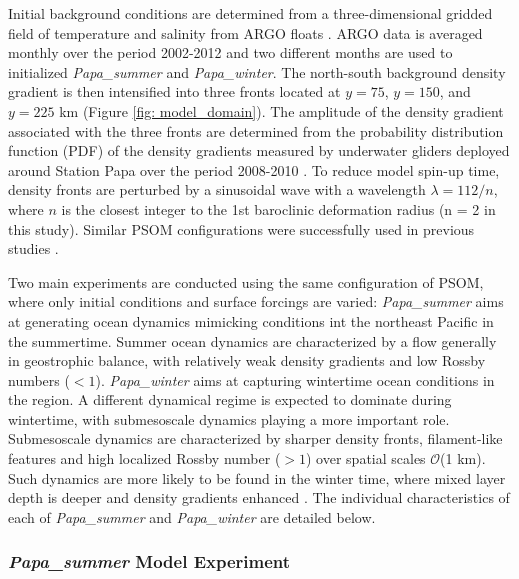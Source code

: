 \documentclass[draft,linenumbers]{agujournal2018}
\begin{document}
Initial background conditions are determined from a three-dimensional gridded field of temperature and salinity from ARGO floats \citep{Gaillard_2009,Gaillard_2016}. ARGO data is averaged monthly over the period 2002-2012 and two different months are used to initialized \textit{Papa\_summer} and \textit{Papa\_winter}. The north-south background density gradient is then intensified into three fronts located at $y = 75$, $y = 150$, and $y = 225$ km (Figure \ref{fig: model_domain}). The amplitude of the density gradient associated with the three fronts are determined from the probability distribution function (PDF) of the density gradients measured by underwater gliders deployed around Station Papa over the period 2008-2010 \citep{Pelland_2016}. To reduce model spin-up time, density fronts are perturbed by a sinusoidal wave with a wavelength $\lambda = 112/n$, where $n$ is the closest integer to the 1st baroclinic deformation radius (n = 2 in this study). Similar PSOM configurations were successfully used in previous studies \citep{Mahadevan_2012,Omand_2015}.

Two main experiments are conducted using the same configuration of PSOM, where only initial conditions and surface forcings are varied: \textit{Papa\_summer} aims at generating ocean dynamics mimicking conditions int the northeast Pacific in the summertime. Summer ocean dynamics are characterized by a flow generally in geostrophic balance, with relatively weak density gradients and low Rossby numbers ($<1$). \textit{Papa\_winter} aims at capturing wintertime ocean conditions in the region. A different dynamical regime is expected to dominate during wintertime, with submesoscale dynamics playing a more important role. Submesoscale dynamics are characterized by sharper density fronts, filament-like features and high localized Rossby number ($>1$) over spatial scales $\mathcal{O}$(1 km). Such dynamics are more likely to be found in the winter time, where mixed layer depth is deeper and density gradients enhanced \citep{Thompson_2016}. The individual characteristics of each of \textit{Papa\_summer} and \textit{Papa\_winter} are detailed below.

\subsubsection{\textit{Papa\_summer} Model Experiment}
\end{document}
